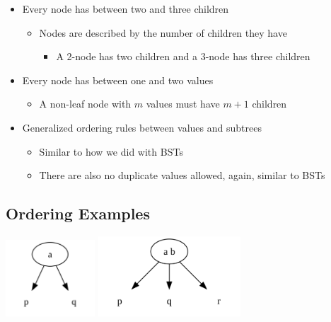 \documentclass[
  10pt,
  english,
  letterpaper,
,tablecaptionabove
]{scrartcl}
\providecommand{\tightlist}{%
  \setlength{\itemsep}{0pt}\setlength{\parskip}{0pt}}
\begin{document}
\begin{itemize}
\tightlist
\item
  Every node has between two and three children

  \begin{itemize}
  \tightlist
  \item
    Nodes are described by the number of children they have

    \begin{itemize}
    \tightlist
    \item
      A 2-node has two children and a 3-node has three children
    \end{itemize}
  \end{itemize}
\item
  Every node has between one and two values

  \begin{itemize}
  \tightlist
  \item
    A non-leaf node with \(m\) values must have \(m+1\) children
  \end{itemize}
\item
  Generalized ordering rules between values and subtrees

  \begin{itemize}
  \tightlist
  \item
    Similar to how we did with BSTs
  \item
    There are also no duplicate values allowed, again, similar to BSTs
  \end{itemize}
\end{itemize}

\hypertarget{ordering-examples}{%
\subsection{Ordering Examples}\label{ordering-examples}}

\includegraphics[width=0.25\textwidth,height=\textheight]{images/1.png}
\includegraphics[width=0.4\textwidth,height=\textheight]{images/2.png}
\end{document}
